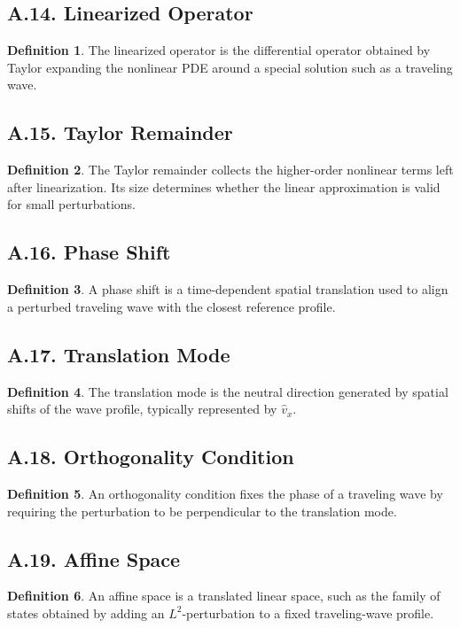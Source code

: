 \documentclass[11pt]{article}
\theoremstyle{definition}
\newtheorem{definition}{Definition}
\theoremstyle{remark}
\begin{document}
\subsection*{A.14. Linearized Operator}
\begin{definition}
The linearized operator is the differential operator obtained by Taylor expanding the nonlinear PDE around a special solution such as a traveling wave.
\end{definition}

\subsection*{A.15. Taylor Remainder}
\begin{definition}
The Taylor remainder collects the higher-order nonlinear terms left after linearization. Its size determines whether the linear approximation is valid for small perturbations.
\end{definition}

\subsection*{A.16. Phase Shift}
\begin{definition}
A phase shift is a time-dependent spatial translation used to align a perturbed traveling wave with the closest reference profile.
\end{definition}

\subsection*{A.17. Translation Mode}
\begin{definition}
The translation mode is the neutral direction generated by spatial shifts of the wave profile, typically represented by \(\widehat v_x\).
\end{definition}

\subsection*{A.18. Orthogonality Condition}
\begin{definition}
An orthogonality condition fixes the phase of a traveling wave by requiring the perturbation to be perpendicular to the translation mode.
\end{definition}

\subsection*{A.19. Affine Space}
\begin{definition}
An affine space is a translated linear space, such as the family of states obtained by adding an \(L^2\)-perturbation to a fixed traveling-wave profile.
\end{definition}
\end{document}
